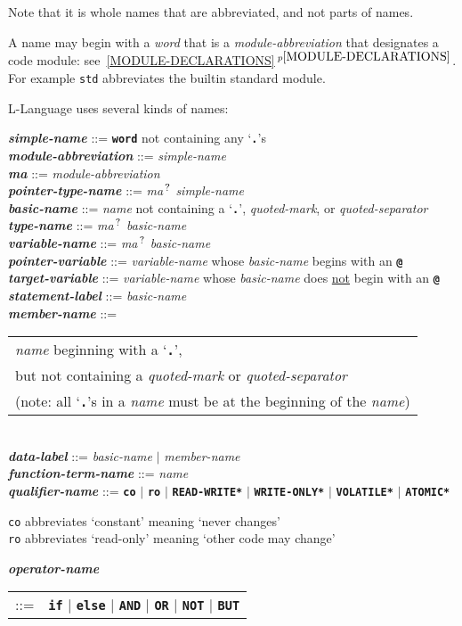 \documentclass[12pt]{article}
\newcommand{\TT}[1]{{\tt \bfseries #1}}
\newcommand{\QMARK}{{$^{\,\mbox{\footnotesize ?}}$}}
\newcommand{\MA}{{\em ma}\QMARK}
\newcommand{\ttkey}[1]{{\tt \bfseries #1}}
\newcommand{\emkey}[1]{{\em \bfseries #1}}
\newcommand{\ttakey}[1]{{\tt \bfseries *#1*}}
\newcommand{\itemref}[1]{\ref{#1}$\,^{p\pageref{#1}}$}
\newenvironment{indpar}[1][0.3in]%
	{\begin{list}{}%
		     {\setlength{\itemsep}{0in}%
		      \setlength{\topsep}{0in}%
		      \setlength{\parsep}{1ex}%
		      \setlength{\labelwidth}{#1}%
		      \setlength{\leftmargin}{#1}%
		      \addtolength{\leftmargin}{\labelsep}}%
	 \item}%
	{\end{list}}
\begin{document}
Note that it is whole names that are abbreviated, and not parts of
names.

A name may begin with a {\em word} that is a {\em module-abbreviation}
that designates a code module: see~\itemref{MODULE-DECLARATIONS}.
For example {\tt std} abbreviates the builtin standard module.

L-Language uses several kinds of names:

\begin{indpar}
\emkey{simple-name} ::= \TT{word} not containing any `\TT{.}'s \\
\emkey{module-abbreviation} ::= {\em simple-name} \\
\emkey{ma} ::= {\em module-abbreviation} \\
\emkey{pointer-type-name}\label{POINTER-TYPE-NAME} ::=
    \MA{} {\em simple-name}
\\[1ex]
\emkey{basic-name}\label{BASIC-NAME} ::=
	    {\em name} not containing a `\TT{.}', {\em quoted-mark}, or
	    {\em quoted-separator} \\
\emkey{type-name}\label{TYPE-NAME} ::=
    \MA{} {\em basic-name} \\
\emkey{variable-name}\label{VARIABLE-NAME} ::=
    \MA{} {\em basic-name} \\
\emkey{pointer-variable}\label{POINTER-VARIABLE} ::=
    {\em variable-name} whose {\em basic-name} begins with an \TT{@} \\
\emkey{target-variable}\label{TARGET-VARIABLE} ::=
    {\em variable-name} whose {\em basic-name} does \underline{not}
    begin with an \TT{@} \\
\emkey{statement-label} ::= {\em basic-name}
    \label{STATEMENT-LABEL}
\\[1ex]
\emkey{member-name}\label{MEMBER-NAME}
	::= \begin{tabular}[t]{@{}l@{}}
                        {\em name} beginning with a `\TT{.}', \\
			but not containing a {\em quoted-mark} or
			    {\em quoted-separator} \\
			(note: all `\TT{.}'s in a {\em name} must be at
			 the beginning of the {\em name})
			\end{tabular} \\
\emkey{data-label}\label{DATA-LABEL} ::=
    {\em basic-name} $|$ {\em member-name}
\\[1ex]
\emkey{function-term-name} ::= {\em name}
    \label{FUNCTION-TERM-NAME}
\\[1ex]
\emkey{qualifier-name}\label{QUALIFIER-NAME} ::=
    \ttkey{co} $|$ \ttkey{ro} $|$ \ttakey{READ-WRITE} $|$
    \ttakey{WRITE-ONLY} $|$ \ttakey{VOLATILE} $|$ \ttakey{ATOMIC}
\begin{indpar}
{\tt co} abbreviates `constant' meaning `never changes' \\
{\tt ro} abbreviates `read-only' meaning `other code may change'
\end{indpar}
\emkey{operator-name}
    \begin{tabular}[t]{rl}
    ::= & \TT{if} $|$ \TT{else}
                  $|$ \TT{AND} $|$ \TT{OR}
		  $|$ \TT{NOT} $|$ \TT{BUT}
    \end{tabular}


\end{indpar}
\end{document}
